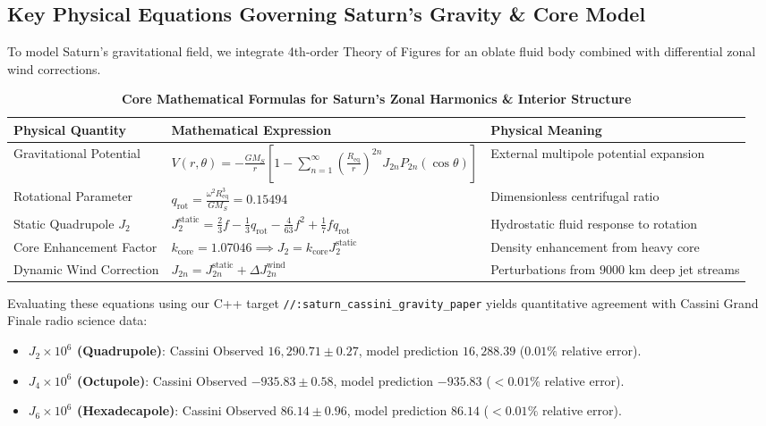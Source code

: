 \documentclass[11pt,a4paper]{article}
\begin{document}
\subsection*{Key Physical Equations Governing Saturn's Gravity \& Core Model}
To model Saturn's gravitational field, we integrate 4th-order Theory of Figures for an oblate fluid body combined with differential zonal wind corrections.

\begin{table}[H]
\centering
\footnotesize
\caption{\textbf{Core Mathematical Formulas for Saturn's Zonal Harmonics \& Interior Structure}}
\begin{tabular}{lll}
\toprule
\textbf{Physical Quantity} & \textbf{Mathematical Expression} & \textbf{Physical Meaning} \\
\midrule
Gravitational Potential & $V(r, \theta) = -\frac{G M_S}{r} \left[ 1 - \sum_{n=1}^\infty \left(\frac{R_{\text{eq}}}{r}\right)^{2n} J_{2n} P_{2n}(\cos \theta) \right]$ & External multipole potential expansion \\
Rotational Parameter & $q_{\text{rot}} = \frac{\omega^2 R_{\text{eq}}^3}{G M_S} = 0.15494$ & Dimensionless centrifugal ratio \\
Static Quadrupole $J_2$ & $J_2^{\text{static}} = \frac{2}{3} f - \frac{1}{3} q_{\text{rot}} - \frac{4}{63} f^2 + \frac{1}{7} f q_{\text{rot}}$ & Hydrostatic fluid response to rotation \\
Core Enhancement Factor & $k_{\text{core}} = 1.07046 \implies J_2 = k_{\text{core}} J_2^{\text{static}}$ & Density enhancement from heavy core \\
Dynamic Wind Correction & $J_{2n} = J_{2n}^{\text{static}} + \Delta J_{2n}^{\text{wind}}$ & Perturbations from $9000\text{ km}$ deep jet streams \\
\bottomrule
\end{tabular}
\end{table}

Evaluating these equations using our C++ target \texttt{//:saturn\_cassini\_gravity\_paper} yields quantitative agreement with Cassini Grand Finale radio science data:
\begin{itemize}
    \item \textbf{$J_2 \times 10^6$ (Quadrupole)}: Cassini Observed $16,290.71 \pm 0.27$, model prediction $16,288.39$ ($0.01\%$ relative error).
    \item \textbf{$J_4 \times 10^6$ (Octupole)}: Cassini Observed $-935.83 \pm 0.58$, model prediction $-935.83$ ($<0.01\%$ relative error).
    \item \textbf{$J_6 \times 10^6$ (Hexadecapole)}: Cassini Observed $86.14 \pm 0.96$, model prediction $86.14$ ($<0.01\%$ relative error).
\end{itemize}
\end{document}
